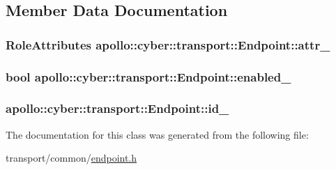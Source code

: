 \subsection{Member Data Documentation}
\hypertarget{classapollo_1_1cyber_1_1transport_1_1Endpoint_ae5eef9d783a55addf75c73f3b2d3d922}{
\subsubsection[{attr\-\_\-}]{\setlength{\rightskip}{0pt plus 5cm}Role\-Attributes apollo\-::cyber\-::transport\-::\-Endpoint\-::attr\-\_\-\hspace{0.3cm}{\ttfamily [protected]}}}\label{classapollo_1_1cyber_1_1transport_1_1Endpoint_ae5eef9d783a55addf75c73f3b2d3d922}
\hypertarget{classapollo_1_1cyber_1_1transport_1_1Endpoint_a018bd12d292d6f46e97bb34d3054d5d2}{
\subsubsection[{enabled\-\_\-}]{\setlength{\rightskip}{0pt plus 5cm}bool apollo\-::cyber\-::transport\-::\-Endpoint\-::enabled\-\_\-\hspace{0.3cm}{\ttfamily [protected]}}}\label{classapollo_1_1cyber_1_1transport_1_1Endpoint_a018bd12d292d6f46e97bb34d3054d5d2}
\hypertarget{classapollo_1_1cyber_1_1transport_1_1Endpoint_ab13e5b3e9b7b614f687159ad7ff07655}{
\subsubsection[{id\-\_\-}]{ apollo\-::cyber\-::transport\-::\-Endpoint\-::id\-\_\-\hspace{0.3cm}{\ttfamily [protected]}}}\label{classapollo_1_1cyber_1_1transport_1_1Endpoint_ab13e5b3e9b7b614f687159ad7ff07655}


The documentation for this class was generated from the following file\-:\begin{DoxyCompactItemize}
\item 
transport/common/\hyperlink{endpoint_8h}{endpoint.\-h}\end{DoxyCompactItemize}
